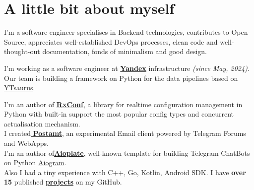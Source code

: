 \documentclass[a4paper,10pt]{article}
\newcommand{\MySkip}{
\vskip12pt
}
\begin{document}
\begin{adjustbox}{valign=t}
\begin{minipage}{0.6\textwidth}
\section*{A little bit about myself}
\begin{description}
\raggedright \normalfont
I'm a software engineer specialises in Backend technologies, contributes to Open-Source, appreciates well-established DevOps processes, clean code and well-thought-out documentation, fonds of minimalism and good design.
\MySkip
I'm working as a software engineer at \href{https://ya.ru}{{\textbf{Yandex}}} infrastructure \textit{(since May, 2024)}. Our team is building a framework on Python for the data pipelines based on \href{https://github.com/ytsaurus/ytsaurus}{YTsaurus}.
\MySkip
I'm an author of \href{https://realkarych.github.io/rxconf/}{\textbf{RxConf}}, a library for realtime configuration management in Python with built-in support the most popular config types and concurrent actualisation mechanism. \\
I created\hspace{0.5em}\href{https://github.com/realkarych/postamt/}{ \textbf{Postamt}}, an experimental Email client powered by Telegram Forums and WebApps. \\
I'm an author of\hspace{0.5em}\href{https://github.com/realkarych/aioplate/}{\faGithub\hspace{0.2em}\textbf{Aioplate}}, well-known template for building Telegram ChatBots on Python \href{https://aiogram.dev/}{Aiogram}. \\
Also I had a tiny experience with C++, Go, Kotlin, Android SDK. I have \textbf{over 15} published \href{https://github.com/realkarych}{\textbf{projects}} on my GitHub. \\

\end{description}


\end{minipage}
\end{adjustbox}
\end{document}
